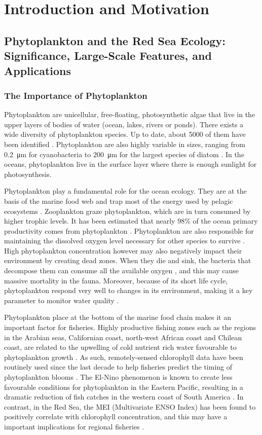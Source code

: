 \chapter{Introduction and Motivation}

\section{Phytoplankton and the Red Sea Ecology: Significance, Large-Scale
Features, and Applications}

\subsection{The Importance of Phytoplankton}

Phytoplankton are unicellular, free-floating, photosynthetic algae that live in
the upper layers of bodies of water (ocean, lakes, rivers or ponds). There
exists a wide diversity of phytoplankton species. Up to date, about 5000 of
them have been identified \citep{Tett1995}. Phytoplankton are also highly
variable in sizes, ranging from \SI{0.2}{\micro\metre} for cyanobacteria to
\SI{200}{\micro\metre} for the largest species of diatom \citep{Pal2014}. In
the oceans, phytoplankton live in the surface layer where there is enough
sunlight for photosynthesis. 

Phytoplankton play a fundamental role for the ocean ecology. They are at the
basis of the marine food web and trap most of the energy used by pelagic
ecosystems \citep{Pal2014}. Zooplankton graze phytoplankton, which are in turn
consumed by higher trophic levels. It has been estimated that nearly 98\% of
the ocean primary productivity comes from phytoplankton \citep{Pal2014}.
Phytoplankton are also responsible for maintaining the dissolved oxygen level
necessary for other species to survive \citep{Pal2014}. High phytoplankton
concentration however may also negatively impact their environment by creating
dead zones. When they die and sink, the bacteria that decompose them can
consume all the available oxygen \citep{Pal2014}, and this may cause massive
mortality in the fauna. Moreover, because of its short life cycle,
phytoplankton respond very well to changes in its environment, making it a key
parameter to monitor water quality \citep{Wu2014}.

Phytoplankton place at the bottom of the marine food chain makes it an
important factor for fisheries. Highly productive fishing zones such as the
regions in the Arabian seas, Californian coast, north-west African coast and
Chilean coast, are related to the upwelling of cold nutrient rich water
favourable to phytoplankton growth \citep{Mann2006}. As such, remotely-sensed
chlorophyll data have been routinely used since the last decade to help
fisheries predict the timing of phytoplankton blooms \citep{Robinson2010}. The
El-Nino phenomenon is known to create less favourable conditions for
phytoplankton in the Eastern Pacific, resulting in a dramatic reduction of fish
catches in the western coast of South America
\citep{Robinson2010}. In contrast, in the Red Sea, the MEI (Multivariate ENSO
Index) has been found to positively correlate with chlorophyll concentration,
and this may have a important implications for regional fisheries
\citep{Raitsos2015}.

